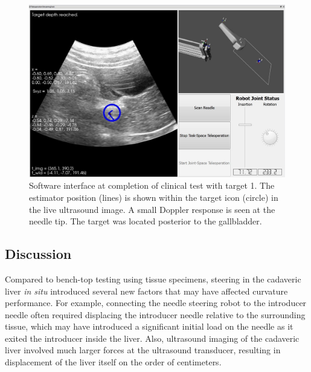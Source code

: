 \begin{figure}[!t]
\centering
\includegraphics[width = \columnwidth]{./Images/Chapter5/CadaverAtTarget/CadaverAtTarget.jpg}%
\caption[Software interface at completion of clinical test]{Software interface at completion of clinical test with target 1. The estimator position (lines) is shown within the target icon (circle) in the live ultrasound image. A small Doppler response is seen at the needle tip. The target was located posterior to the gallbladder.}
\label{fig:CadaverAtTarget}
\end{figure}  

\subsection{Discussion}
Compared to bench-top testing using tissue specimens, steering in the cadaveric liver \textit{in situ} introduced several new factors that may have affected curvature performance. For example, connecting the needle steering robot to the introducer needle often required displacing the introducer needle relative to the surrounding tissue, which may have introduced a significant initial load on the needle as it exited the introducer inside the liver. Also, ultrasound imaging of the cadaveric liver involved much larger forces at the ultrasound transducer, resulting in displacement of the liver itself on the order of centimeters. 

